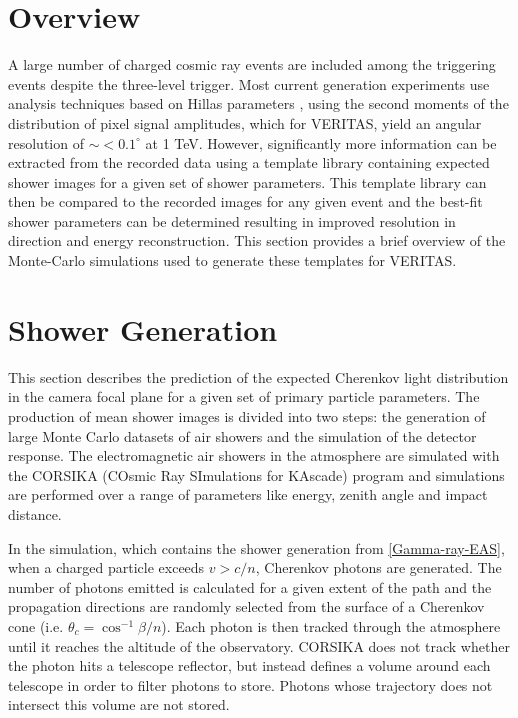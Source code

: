 \documentclass[main.tex]{subfiles}
\begin{document}
\section{Overview}
A large number of charged cosmic ray events are included among the triggering events despite the three-level trigger. Most current generation experiments use analysis techniques based on Hillas parameters \cite{Hillas:1985}, using the second moments of the distribution of pixel signal amplitudes, which for VERITAS, yield an angular resolution of $\sim <0.1^\circ$ at 1 TeV. However, significantly more information can be extracted from the recorded data using a template library containing expected shower images for a given set of shower parameters. This template library can then be compared to the recorded images for any given event and the best-fit shower parameters can be determined resulting in improved resolution in direction and energy reconstruction. This section provides a brief overview of the Monte-Carlo simulations used to generate these templates for VERITAS.

\section{Shower Generation}
This section describes the prediction of the expected Cherenkov light distribution in the camera focal plane for a given set of primary particle parameters. The production of mean shower images is divided into two steps: the generation of large Monte Carlo datasets of air showers and the simulation of the detector response. The electromagnetic air showers in the atmosphere are simulated with the CORSIKA (COsmic Ray SImulations for KAscade) program and simulations are performed over a range of parameters like energy, zenith angle and impact distance. 

In the simulation, which contains the shower generation from \ref{Gamma-ray-EAS}, when a charged particle exceeds $v>c/n$, Cherenkov photons are generated. The number of photons emitted is calculated for a given extent of the path and the propagation directions are randomly selected from the surface of a Cherenkov cone (i.e. $\theta_c = \cos^{-1}\beta/n$). Each photon is then tracked through the atmosphere until it reaches the altitude of the observatory. CORSIKA does not track whether the photon hits a telescope reflector, but instead defines a volume around each telescope in order to filter photons to store. Photons whose trajectory does not intersect this volume are not stored.
\end{document}
